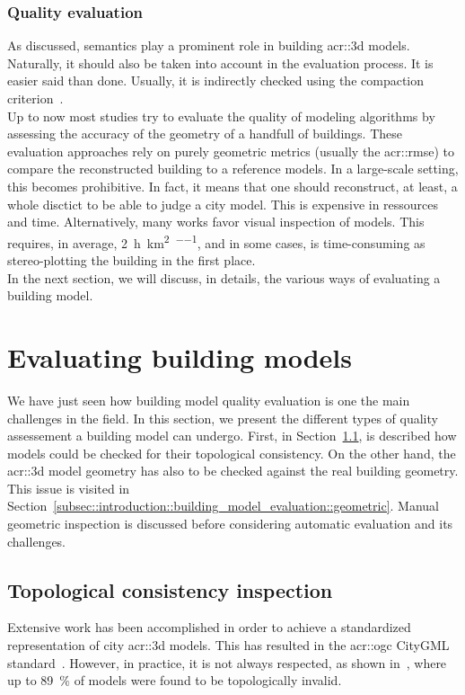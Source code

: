         \subsubsection{Quality evaluation}
            As discussed, semantics play a prominent role in building \gls{acr::3d} models.
            Naturally, it should also be taken into account in the evaluation process.
            It is easier said than done.
            Usually, it is indirectly checked using the compaction criterion~\parencite{lafarge2012creating}.\\
            Up to now most studies try to evaluate the quality of modeling algorithms by assessing the accuracy of the geometry of a handfull of buildings.
            These evaluation approaches rely on purely geometric metrics (usually the \gls{acr::rmse}) to compare the reconstructed building to a reference models.
            In a large-scale setting, this becomes prohibitive.
            In fact, it means that one should reconstruct, at least, a whole disctict to be able to judge a city model.
            This is expensive in ressources and time.
            Alternatively, many works favor visual inspection of models.
            This requires, in average, \SI[per-mode=repeated-symbol]{2}{\hour\per\km\squared\per\expert}, and in some cases, is time-consuming  as stereo-plotting the building in the first place.\\
            In the next section, we will discuss, in details, the various ways of evaluating a building model.

\section{Evaluating building models}
    \label{sec::introduction::building_model_evaluation}
    We have just seen how building model quality evaluation is one the main challenges in the field.
    In this section, we present the different types of quality assessement a building model can undergo.
    First, in Section~\ref{subsec::introduction::building_model_evaluation::topological}, is described how models could be checked for their topological consistency.
    On the other hand, the \gls{acr::3d} model geometry has also to be checked against the real building geometry.
    This issue is visited in Section~\ref{subsec::introduction::building_model_evaluation::geometric}.
    Manual geometric inspection is discussed before considering automatic evaluation and its challenges.

    \subsection{Topological consistency inspection}
        \label{subsec::introduction::building_model_evaluation::topological}
        Extensive work has been accomplished in order to achieve a standardized representation of city \gls{acr::3d} models.
        This has resulted in the \gls{acr::ogc} CityGML standard~\parencite{groger2012ogc}.
        However, in practice, it is not always respected, as shown in~\textcite{biljecki2016most}, where up to \SI{89}{\percent} of models were found to be topologically invalid.\\

